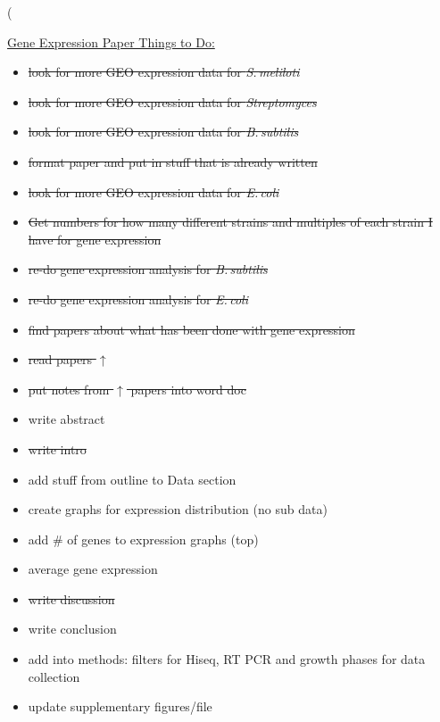 \left( \documentclass[12pt]{article}
\newcommand{\smel}{\textit{S.\,meliloti}\xspace}
\newcommand{\strep}{\textit{Streptomyces}\xspace}
\newcommand{\bass}{\textit{B.\,subtilis}\xspace}
\newcommand{\ecol}{\textit{E.\,coli}\xspace}
\begin{document}
\underline{Gene Expression Paper Things to Do:}
\begin{itemize}
	
	\item \sout{look for more GEO expression data for \smel}
	
	\item \sout{look for more GEO expression data for \strep}
	
	\item \sout{look for more GEO expression data for \bass}
	
	\item \sout{format paper and put in stuff that is already written}
	
	\item \sout{look for more GEO expression data for \ecol}
	
	\item \sout{Get numbers for how many different strains and multiples of each strain I have for gene expression}
	
	\item \sout{re-do gene expression analysis for \bass}
	
	\item \sout{re-do gene expression analysis for \ecol}
	
	\item \sout{find papers about what has been done with gene expression}
	
	\item \sout{read papers $\uparrow$}
	
	\item \sout{put notes from $\uparrow$ papers into word doc}
	
	\item write abstract
	
	\item \sout{write intro}
	
	\item add stuff from outline to Data section
	
	\item create graphs for expression distribution (no sub data)
	
	\item add \# of genes to expression graphs (top)
	
	\item average gene expression
	
	\item \sout{write discussion}
	
	\item write conclusion
	
	\item add into methods: filters for Hiseq, RT PCR and growth phases for data collection
	
	\item update supplementary figures/file
	
\end{itemize}
\end{document}
